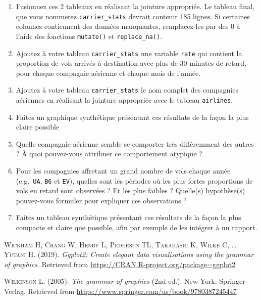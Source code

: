 \documentclass[a4paperpaper,]{article}
\begin{document}
\begin{enumerate}
\def\labelenumi{\arabic{enumi}.}
\setcounter{enumi}{2}
\item
  Fusionnez ces 2 tableaux en réalisant la jointure appropriée. Le tableau final, que vous nommerez \texttt{carrier\_stats} devrait contenir 185 lignes. Si certaines colonnes contiennent des données manquantes, remplacez-les par des 0 à l'aide des fonctions \texttt{mutate()} et \texttt{replace\_na()}.
\item
  Ajoutez à votre tableau \texttt{carrier\_stats} une variable \texttt{rate} qui contient la proportion de vols arrivés à destination avec plus de 30 minutes de retard, pour chaque compagnie aérienne et chaque mois de l'année.
\item
  Ajoutez à votre tableau \texttt{carrier\_stats} le nom complet des compagnies aériennes en réalisant la jointure appropriée avec le tableau \texttt{airlines}.
\item
  Faites un graphique synthétique présentant ces résultats de la façon la plus claire possible
\item
  Quelle compagnie aérienne semble se comporter très différemment des autres ? À quoi pouvez-vous attribuer ce comportement atypique ?
\item
  Pour les compagnies affretant un grand nombre de vols chaque année (e.g.~\texttt{UA}, \texttt{B6} et \texttt{EV}), quelles sont les périodes où les plus fortes proportions de vols en retard sont observées ? Et les plus faibles ? Quelle(s) hypothèse(s) pouvez-vous formuler pour expliquer ces observations ?
\item
  Faites un tableau synthétique présentant ces résultats de la façon la plus compacte et claire que possible, afin par exemple de les intégrer à un rapport.
\end{enumerate}

\hypertarget{refs}{}
\leavevmode\hypertarget{ref-R-ggplot2}{}%
\textsc{Wickham H, Chang W, Henry L, Pedersen TL, Takahashi K, Wilke C, \ldots{} Yutani H}. (2019). \emph{Ggplot2: Create elegant data visualisations using the grammar of graphics}. Retrieved from \url{https://CRAN.R-project.org/package=ggplot2}

\leavevmode\hypertarget{ref-wilkinson2005}{}%
\textsc{Wilkinson L}. (2005). \emph{The grammar of graphics} (2nd ed.). New-York: Springer-Verlag. Retrieved from \url{https://www.springer.com/us/book/9780387245447}
\end{document}
